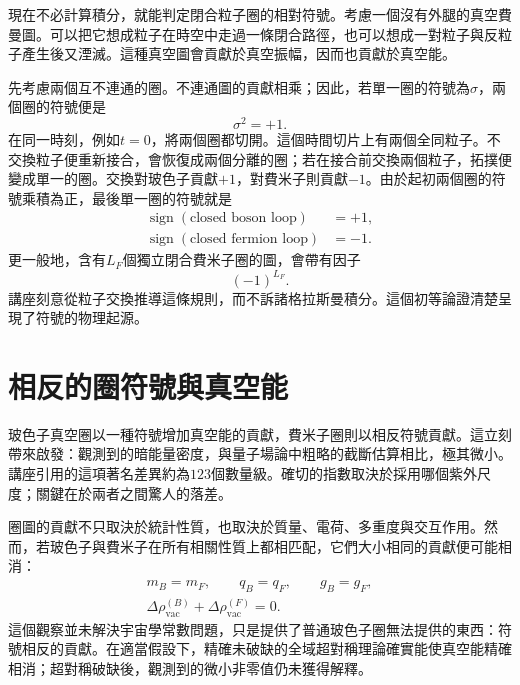 現在不必計算積分，就能判定閉合粒子圈的相對符號。考慮一個沒有外腿的真空費曼圖。可以把它想成粒子在時空中走過一條閉合路徑，也可以想成一對粒子與反粒子產生後又湮滅。這種真空圖會貢獻於真空振幅，因而也貢獻於真空能。

先考慮兩個互不連通的圈。不連通圖的貢獻相乘；因此，若單一圈的符號為\(\sigma\)，兩個圈的符號便是
\begin{equation}
\sigma^2=+1.
\end{equation}
在同一時刻，例如\(t=0\)，將兩個圈都切開。這個時間切片上有兩個全同粒子。不交換粒子便重新接合，會恢復成兩個分離的圈；若在接合前交換兩個粒子，拓撲便變成單一的圈。交換對玻色子貢獻\(+1\)，對費米子則貢獻\(-1\)。由於起初兩個圈的符號乘積為正，最後單一圈的符號就是
\begin{equation}
\begin{aligned}
\operatorname{sign}(\text{closed boson loop})&=+1,\\
\operatorname{sign}(\text{closed fermion loop})&=-1.
\end{aligned}
\end{equation}
更一般地，含有\(L_F\)個獨立閉合費米子圈的圖，會帶有因子
\begin{equation}
(-1)^{L_F}.
\end{equation}
講座刻意從粒子交換推導這條規則，而不訴諸格拉斯曼積分。這個初等論證清楚呈現了符號的物理起源。

\section{相反的圈符號與真空能}

玻色子真空圈以一種符號增加真空能的貢獻，費米子圈則以相反符號貢獻。這立刻帶來啟發：觀測到的暗能量密度，與量子場論中粗略的截斷估算相比，極其微小。講座引用的這項著名差異約為\(123\)個數量級。確切的指數取決於採用哪個紫外尺度；關鍵在於兩者之間驚人的落差。

圈圖的貢獻不只取決於統計性質，也取決於質量、電荷、多重度與交互作用。然而，若玻色子與費米子在所有相關性質上都相匹配，它們大小相同的貢獻便可能相消：
\begin{equation}
\begin{gathered}
m_B=m_F,\qquad q_B=q_F,\qquad g_B=g_F,\\
\Delta\rho_{\mathrm{vac}}^{(B)}
+\Delta\rho_{\mathrm{vac}}^{(F)}=0.
\end{gathered}
\end{equation}
這個觀察並未解決宇宙學常數問題，只是提供了普通玻色子圈無法提供的東西：符號相反的貢獻。在適當假設下，精確未破缺的全域超對稱理論確實能使真空能精確相消；超對稱破缺後，觀測到的微小非零值仍未獲得解釋。

